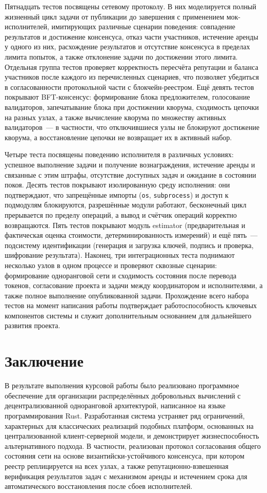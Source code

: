 \documentclass[a4paper,11pt]{extarticle}
\begin{document}
Пятнадцать тестов посвящены сетевому протоколу. В них моделируется полный
жизненный цикл задачи от публикации до завершения с применением мок-исполнителей,
имитирующих различные сценарии поведения: совпадение результатов и достижение
консенсуса, отказ части участников, истечение аренды у одного из них,
расхождение результатов и отсутствие консенсуса в пределах лимита попыток, а
также отклонение задачи по достижении этого лимита. Отдельная группа тестов
проверяет корректность пересчёта репутации и баланса участников после каждого
из перечисленных сценариев, что позволяет убедиться в согласованности
протокольной части с блокчейн-реестром. Ещё девять тестов покрывают
BFT-консенсус: формирование блока предложителем, голосование валидаторов,
запечатывание блока при достижении кворума, сходимость цепочки на разных узлах,
а также вычисление кворума по множеству активных валидаторов~--- в частности,
что отключившиеся узлы не блокируют достижение кворума, а восстановление цепочки
не возвращает их в активный набор.

Четыре теста посвящены поведению исполнителя в различных условиях: успешное
выполнение задачи и получение вознаграждения, истечение аренды и связанные с
этим штрафы, отсутствие доступных задач и ожидание в состоянии покоя. Десять
тестов покрывают изолированную среду исполнения: они подтверждают, что
запрещённые импорты (\texttt{os}, \texttt{subprocess}) и доступ к подмодулям
блокируются, разрешённые модули работают, бесконечный цикл прерывается по
пределу операций, а вывод и счётчик операций корректно возвращаются. Пять
тестов покрывают модуль estimator (предварительная и фактическая оценка
стоимости, детерминированность измерений) и ещё пять~--- подсистему
идентификации (генерация и загрузка ключей, подпись и проверка, шифрование
результата). Наконец, три интеграционных теста поднимают несколько узлов в
одном процессе и проверяют сквозные сценарии: формирование одноранговой сети и
сходимость состояния после перевода токенов, согласование проекта и задачи
между координатором и исполнителями, а также полное выполнение
опубликованной задачи. Прохождение всего набора тестов на момент написания
работы подтверждает работоспособность ключевых компонентов системы и служит
дополнительным основанием для дальнейшего развития проекта.

\section{Заключение}

В результате выполнения курсовой работы было реализовано программное
обеспечение для организации распределённых добровольных вычислений с
децентрализованной одноранговой архитектурой, написанное на языке
программирования Rust. Разработанная система устраняет ряд ограничений,
характерных для классических реализаций подобных платформ, основанных на
централизованной клиент-серверной модели, и демонстрирует жизнеспособность
альтернативного подхода. В частности, реализован протокол согласования общего
состояния сети на основе византийски-устойчивого консенсуса, при котором реестр
реплицируется на всех узлах, а также репутационно-взвешенная верификация
результатов задач с механизмом аренды и истечением срока для автоматического
восстановления после сбоев исполнителей.
\end{document}
